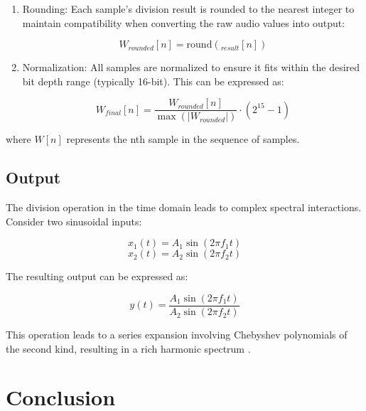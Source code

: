 \documentclass[12pt,a4paper]{article}
\begin{document}
\begin{enumerate}
    \item Rounding: Each sample's division result is rounded to the nearest integer to maintain compatibility when converting the raw audio values into output:
    
    \begin{equation*}
    W_{rounded}[n] = \text{round}(_{result}[n])
    \end{equation*}


    \item Normalization: All samples are normalized to ensure it fits within the desired bit depth range (typically 16-bit). This can be expressed as:
    

    \begin{equation*}
    W_{final}[n] = \frac{W_{rounded}[n]}{\max(|W_{rounded}|)} \cdot (2^{15} - 1)
    \end{equation*}
\end{enumerate}

where $W[n]$ represents the nth sample in the sequence of samples.

\subsection{Output}
The division operation in the time domain leads to complex spectral interactions. Consider two sinusoidal inputs:

\begin{equation*}
x_1(t) = A_1 \sin(2\pi f_1 t)
\end{equation*}
\begin{equation*}
x_2(t) = A_2 \sin(2\pi f_2 t)
\end{equation*}

The resulting output can be expressed as:

\begin{equation*}
y(t) = \frac{A_1 \sin(2\pi f_1 t)}{A_2 \sin(2\pi f_2 t)}
\end{equation*}

This operation leads to a series expansion involving Chebyshev polynomials of the second kind, resulting in a rich harmonic spectrum \cite{Chebyshev}.

\section{Conclusion}
\end{document}

